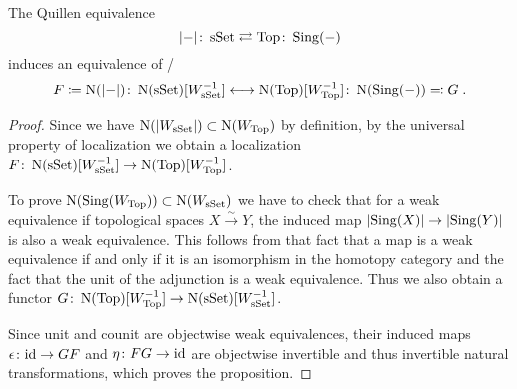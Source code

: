 \begin{prop}\label{prop:homotopyHypothesis}
    The Quillen equivalence 
    \begin{equation*}
        \lvert-\rvert\colon\operatorname{sSet}\rightleftarrows\operatorname{Top}\colon\operatorname{Sing}(-)
    \end{equation*}
    induces an equivalence of \inftycats/ 
    \begin{equation*}
        F\coloneqq\operatorname{N}(\lvert-\rvert)\colon \operatorname{N}(\operatorname{sSet})\lbrack W_{\operatorname{sSet}}^{-1}\rbrack\longleftrightarrow\operatorname{N}(\operatorname{Top})\lbrack W_{\operatorname{Top}}^{-1}\rbrack\colon \operatorname{N}(\operatorname{Sing}(-))\eqqcolon G\;.
    \end{equation*}
    \begin{proof}
        Since we have $\operatorname{N}(\lvert W_{\operatorname{sSet}}\rvert)\subset \operatorname{N}(W_{\operatorname{Top}})$ by definition, by the universal property of localization we obtain a localization $F\colon \operatorname{N}(\operatorname{sSet})\lbrack W_{\operatorname{sSet}}^{-1}\rbrack\to\operatorname{N}(\operatorname{Top})\lbrack W_{\operatorname{Top}}^{-1}\rbrack$.

        To prove $\operatorname{N}(\operatorname{Sing}(W_{\operatorname{Top}}))\subset\operatorname{N}(W_{\operatorname{sSet}})$ we have to check that for a weak equivalence if topological spaces $X\xrightarrow{\sim} Y$, the induced map $\lvert\operatorname{Sing}(X)\rvert\to \lvert\operatorname{Sing}(Y)\rvert$ is also a weak equivalence.
        This follows from that fact that a map is a weak equivalence if and only if it is an isomorphism in the homotopy category and the fact that the unit of the adjunction is a weak equivalence.
        Thus we also obtain a functor $G\colon\operatorname{N}(\operatorname{Top})\lbrack W_{\operatorname{Top}}^{-1}\rbrack\to\operatorname{N}(\operatorname{sSet})\lbrack W_{\operatorname{sSet}}^{-1}\rbrack$.

        Since unit and counit are objectwise weak equivalences, their induced maps $\epsilon\colon\text{id}\to GF$ and $\eta\colon FG\to \text{id}$ are objectwise invertible and thus invertible natural transformations, which proves the proposition. %
    \end{proof}
\end{prop}
    
